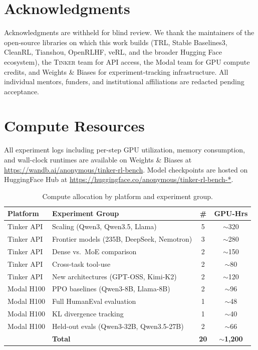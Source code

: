 \documentclass{article}
\newcommand{\tinker}{\textsc{Tinker}}
\begin{document}
\section*{Acknowledgments}
\label{sec:acknowledgments}
Acknowledgments are withheld for blind review. We thank the maintainers of the
open-source libraries on which this work builds (TRL, Stable Baselines3,
CleanRL, Tianshou, OpenRLHF, veRL, and the broader Hugging Face ecosystem),
the \tinker{} team for API access, the Modal team for GPU compute credits,
and Weights \& Biases for experiment-tracking infrastructure. All individual
mentors, funders, and institutional affiliations are redacted pending
acceptance.





\appendix

\section{Compute Resources}
\label{app:compute}

All experiment logs including per-step GPU utilization, memory consumption,
and wall-clock runtimes are available on Weights \& Biases at
\url{https://wandb.ai/anonymous/tinker-rl-bench}.
Model checkpoints are hosted on HuggingFace Hub at
\url{https://huggingface.co/anonymous/tinker-rl-bench-*}.

\begin{table}[htbp]
\centering
\caption{Compute allocation by platform and experiment group.}
\small
\begin{tabular}{@{}llcc@{}}
\toprule
\textbf{Platform} & \textbf{Experiment Group} & \textbf{\#} & \textbf{GPU-Hrs} \\
\midrule
Tinker API & Scaling (Qwen3, Qwen3.5, Llama) & 5 & $\sim$320 \\
Tinker API & Frontier models (235B, DeepSeek, Nemotron) & 3 & $\sim$280 \\
Tinker API & Dense vs.~MoE comparison & 2 & $\sim$150 \\
Tinker API & Cross-task tool-use & 2 & $\sim$80 \\
Tinker API & New architectures (GPT-OSS, Kimi-K2) & 2 & $\sim$120 \\
Modal H100 & PPO baselines (Qwen3-8B, Llama-8B) & 2 & $\sim$96 \\
Modal H100 & Full HumanEval evaluation & 1 & $\sim$48 \\
Modal H100 & KL divergence tracking & 1 & $\sim$40 \\
Modal H100 & Held-out evals (Qwen3-32B, Qwen3.5-27B) & 2 & $\sim$66 \\
\midrule
 & \textbf{Total} & \textbf{20} & $\sim$\textbf{1,200} \\
\bottomrule
\end{tabular}
\end{table}
\end{document}
